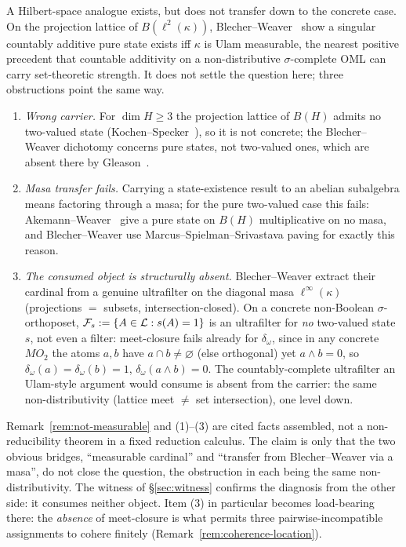 A Hilbert-space analogue exists, but does not transfer down to the concrete case.
On the projection lattice of $B(\ell^2(\kappa))$, Blecher--Weaver~\cite{BlecherWeaver2017}
show a singular countably additive pure state exists iff $\kappa$ is Ulam
measurable, the nearest positive precedent that countable additivity on a
non-distributive $\sigma$-complete OML can carry set-theoretic strength. It does
not settle the question here; three obstructions point the same way.
\begin{enumerate}[label=\textup{(\arabic*)}]
  \item \emph{Wrong carrier.} For $\dim H\geq 3$ the projection lattice of $B(H)$
    admits no two-valued state (Kochen--Specker~\cite{KochenSpecker1967}), so it
    is not concrete; the Blecher--Weaver dichotomy concerns pure states, not
    two-valued ones, which are absent there by Gleason~\cite{Gleason1957}.
  \item \emph{Masa transfer fails.} Carrying a state-existence result to an
    abelian subalgebra means factoring through a masa; for the pure two-valued
    case this fails: Akemann--Weaver~\cite{AkemannWeaver2008} give a pure state
    on $B(H)$ multiplicative on no masa, and Blecher--Weaver use
    Marcus--Spielman--Srivastava paving for exactly this reason.
  \item \emph{The consumed object is structurally absent.} Blecher--Weaver
    extract their cardinal from a genuine ultrafilter on the diagonal masa
    $\ell^\infty(\kappa)$ (projections $=$ subsets, intersection-closed). On a
    concrete non-Boolean $\sigma$-orthoposet,
    $\mathcal F_s := \{A\in\mathcal{L} : s(A)=1\}$ is an ultrafilter for \emph{no}
    two-valued state $s$, not even a filter: meet-closure fails already for
    $\delta_\omega$, since in any concrete $MO_2$ the atoms $a,b$ have
    $a\cap b\neq\varnothing$ (else orthogonal) yet $a\wedge b = 0$, so
    $\delta_\omega(a)=\delta_\omega(b)=1$, $\delta_\omega(a\wedge b)=0$.
    The countably-complete ultrafilter an Ulam-style argument would consume is
    absent from the carrier: the same non-distributivity (lattice meet $\neq$
    set intersection), one level down.
\end{enumerate}

\begin{remark}\label{rem:no-bridge}
Remark~\ref{rem:not-measurable} and (1)--(3) are cited facts assembled, not a
non-reducibility theorem in a fixed reduction calculus. The claim is only that
the two obvious bridges, ``measurable cardinal'' and ``transfer from
Blecher--Weaver via a masa'', do not close the question, the obstruction in each
being the same non-distributivity. The witness of \S\ref{sec:witness} confirms
the diagnosis from the other side: it consumes neither object. Item (3) in
particular becomes load-bearing there: the \emph{absence} of meet-closure is what
permits three pairwise-incompatible assignments to cohere finitely
(Remark~\ref{rem:coherence-location}).
\end{remark}

